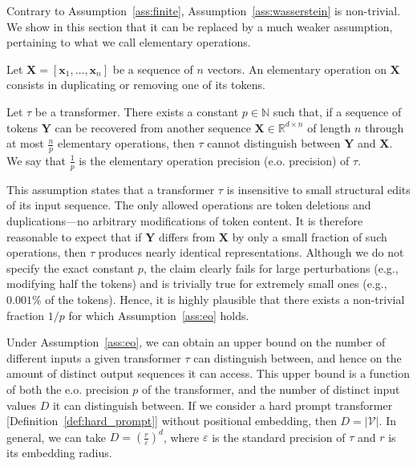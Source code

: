 Contrary to Assumption~\ref{ass:finite}, Assumption~\ref{ass:wasserstein} is non-trivial. We show in this section that it can be replaced by a much weaker assumption, pertaining to what we call elementary operations.

\begin{definition}
    Let $\mathbf X=[\mathbf x_1,\ldots,\mathbf x_n]$ be a sequence of $n$ vectors. An elementary operation on $\mathbf X$ consists in duplicating or removing one of its tokens. 
\end{definition}

\begin{assumption}\label{ass:eo}
    Let $\tau$ be a transformer. There exists a constant $p\in\mathbb N$ such that, if a sequence of tokens $\mathbf Y$ can be recovered from another sequence $\mathbf X\in\mathbb R^{d\times n}$ of length $n$ through at most $\frac n p$ elementary operations, then $\tau$ cannot distinguish between $\mathbf Y$ and $\mathbf X$. We say that $\frac1p$ is the elementary operation precision (e.o. precision) of $\tau$.
\end{assumption}

This assumption states that a transformer $\tau$ is insensitive to small structural edits of its input sequence. The only allowed operations are token deletions and duplications---no arbitrary modifications of token content. It is therefore reasonable to expect that if $\mathbf{Y}$ differs from $\mathbf{X}$ by only a small fraction of such operations, then $\tau$ produces nearly identical representations. Although we do not specify the exact constant $p$, the claim clearly fails for large perturbations (e.g., modifying half the tokens) and is trivially true for extremely small ones (e.g., $0.001\%$ of the tokens). Hence, it is highly plausible that there exists a non-trivial fraction $1/p$ for which Assumption~\ref{ass:eo} holds.

Under Assumption~\ref{ass:eo}, we can obtain an upper bound on the number of different inputs a given transformer $\tau$ can distinguish between, and hence on the amount of distinct output sequences it can access. This upper bound is a function of both the e.o. precision $p$ of the transformer, and the number of distinct input values $D$ it can distinguish between. If we consider a hard prompt transformer [Definition~\ref{def:hard_prompt}] without positional embedding, then $D=|\mathcal V|$. In general, we can take $D=(\frac r \varepsilon)^d$, where $\varepsilon$ is the standard precision of $\tau$ and $r$ is its embedding radius.

